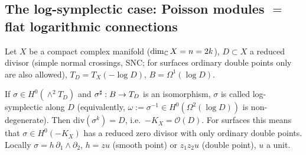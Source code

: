 \subsection{The log-symplectic case: Poisson modules $=$ flat logarithmic connections}\label{subsec:logsymp}
Let $X$ be a compact complex manifold ($\dim_\mathbb C X=n=2k$), $D\subset X$ a reduced divisor (simple normal crossings, SNC; for surfaces ordinary double points only are also allowed), $T_D=T_X(-\log D)$, $B=\Omega^1(\log D)$.
\begin{defn}\tC\label{defn:logsymp}
If $\sigma\in H^0(\wedge^2T_D)$ and $\sigma^\sharp:B\to T_D$ is an isomorphism, $\sigma$ is called log-symplectic along $D$ (equivalently, $\omega:=\sigma^{-1}\in H^0(\Omega^2(\log D))$ is non-degenerate). Then $\mathrm{div}(\sigma^k)=D$, i.e.\ $-K_X=\mathcal O(D)$. For surfaces this means that $\sigma\in H^0(-K_X)$ has a reduced zero divisor with only ordinary double points. Locally $\sigma=h\,\partial_1\wedge\partial_2$, $h=zu$ (smooth point) or $z_1z_2u$ (double point), $u$ a unit.
\end{defn}

